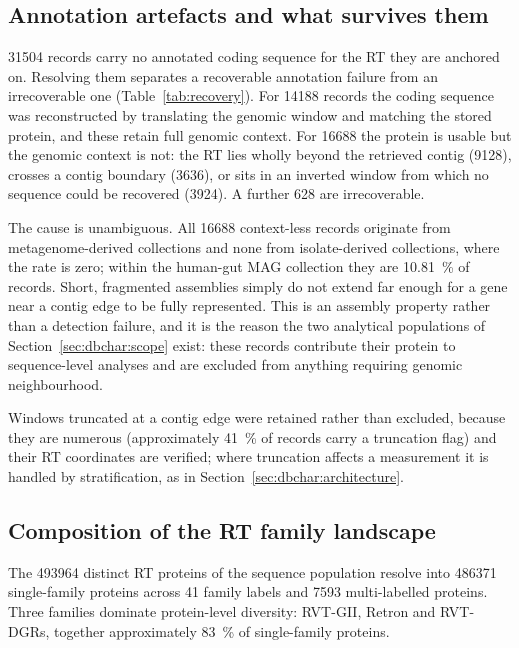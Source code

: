 \subsection{Annotation artefacts and what survives them}
\label{sec:dbchar:qc}

\num{31504} records carry no annotated coding sequence for the RT they are anchored on. Resolving
them separates a recoverable annotation failure from an irrecoverable one
(Table~\ref{tab:recovery}). For \num{14188} records the coding sequence was reconstructed by
translating the genomic window and matching the stored protein, and these retain full genomic
context. For \num{16688} the protein is usable but the genomic context is not: the RT lies wholly
beyond the retrieved contig (\num{9128}), crosses a contig boundary (\num{3636}), or sits in an
inverted window from which no sequence could be recovered (\num{3924}). A further 628 are
irrecoverable.

The cause is unambiguous. All \num{16688} context-less records originate from metagenome-derived
collections and none from isolate-derived collections, where the rate is zero; within the human-gut
MAG collection they are \SI{10.81}{\percent} of records. Short, fragmented assemblies simply do not
extend far enough for a gene near a contig edge to be fully represented. This is an assembly
property rather than a detection failure, and it is the reason the two analytical populations of
Section~\ref{sec:dbchar:scope} exist: these records contribute their protein to sequence-level
analyses and are excluded from anything requiring genomic neighbourhood.

Windows truncated at a contig edge were retained rather than excluded, because they are numerous
(approximately \SI{41}{\percent} of records carry a truncation flag) and their RT coordinates are
verified; where truncation affects a measurement it is handled by stratification, as in
Section~\ref{sec:dbchar:architecture}.

\subsection{Composition of the RT family landscape}
\label{sec:dbchar:families}

The \num{493964} distinct RT proteins of the sequence population resolve into \num{486371}
single-family proteins across 41 family labels and \num{7593} multi-labelled proteins. Three
families dominate protein-level diversity: RVT-GII, Retron and RVT-DGRs, together approximately
\SI{83}{\percent} of single-family proteins.

